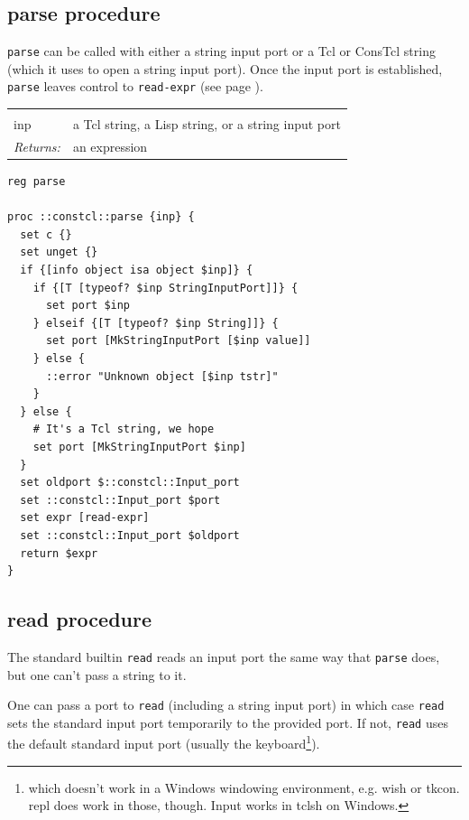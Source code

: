 \documentclass[a5paper,draft]{memoir}
\begin{document}
\subsection{parse procedure}
\label{parse-procedure}

\texttt{parse} can be called with either a string input port or a Tcl or ConsTcl string (which it uses to open a string input port). Once the input port is established, \texttt{parse} leaves control to \texttt{read-expr} (see page \pageref{readexpr-procedure}).

\noindent\begin{tabular}{ |p{1.9cm} p{6.5cm}| }
\hline
\rowcolor[HTML]{CCCCCC} \multicolumn{2}{|l|}{\textbf{parse (internal)}} \\
inp & a Tcl string, a Lisp string, or a string input port \\
\textit{Returns:} & an expression \\
\hline
\end{tabular}

\begin{lstlisting}
reg parse

proc ::constcl::parse {inp} {
  set c {}
  set unget {}
  if {[info object isa object $inp]} {
    if {[T [typeof? $inp StringInputPort]]} {
      set port $inp
    } elseif {[T [typeof? $inp String]]} {
      set port [MkStringInputPort [$inp value]]
    } else {
      ::error "Unknown object [$inp tstr]"
    }
  } else {
    # It's a Tcl string, we hope
    set port [MkStringInputPort $inp]
  }
  set oldport $::constcl::Input_port
  set ::constcl::Input_port $port
  set expr [read-expr]
  set ::constcl::Input_port $oldport
  return $expr
}
\end{lstlisting}

\subsection{read procedure}
\label{read-procedure}

The standard builtin \texttt{read} reads an input port the same way that \texttt{parse} does, but one can't pass a string to it.

One can pass a port to \texttt{read} (including a string input port) in which case \texttt{read} sets the standard input port temporarily to the provided port. If not, \texttt{read} uses the default standard input port (usually the keyboard\footnote{which doesn't work in a Windows windowing environment, e.g. wish or tkcon. repl does work in those, though. Input works in tclsh on Windows.}).
\end{document}
